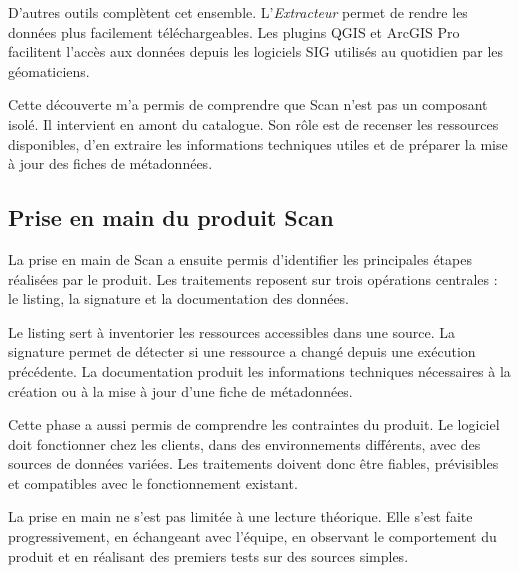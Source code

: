 D'autres outils complètent cet ensemble. L'\textit{Extracteur} permet de rendre
les données plus facilement téléchargeables. Les plugins QGIS et ArcGIS Pro
facilitent l'accès aux données depuis les logiciels SIG utilisés au quotidien
par les géomaticiens.

Cette découverte m'a permis de comprendre que Scan n'est pas un composant isolé.
Il intervient en amont du catalogue. Son rôle est de recenser les ressources
disponibles, d'en extraire les informations techniques utiles et de préparer la
mise à jour des fiches de métadonnées.



\subsection{Prise en main du produit Scan}
\label{subsec:prise_en_main_scan}

La prise en main de Scan a ensuite permis d'identifier les principales étapes
réalisées par le produit. Les traitements reposent sur trois opérations
centrales : le listing, la signature et la documentation des données.

Le listing sert à inventorier les ressources accessibles dans une source. La
signature permet de détecter si une ressource a changé depuis une exécution
précédente. La documentation produit les informations techniques nécessaires à
la création ou à la mise à jour d'une fiche de métadonnées.

Cette phase a aussi permis de comprendre les contraintes du produit. Le logiciel doit
fonctionner chez les clients, dans des environnements différents, avec des
sources de données variées. Les traitements doivent donc être fiables,
prévisibles et compatibles avec le fonctionnement existant.

La prise en main ne s'est pas limitée à une lecture théorique. Elle s'est faite
progressivement, en échangeant avec l'équipe, en observant le comportement du
produit et en réalisant des premiers tests sur des sources simples.


